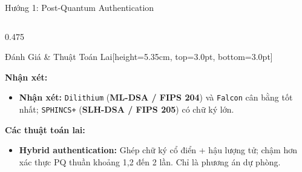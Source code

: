 \documentclass[aspectratio=169, 10pt]{beamer}
\begin{document}
\begin{frame}{Hướng 1: Post-Quantum Authentication}
\begin{columns}[T]
		\begin{column}{0.475\textwidth}
			\begin{accentcard}[uetgreen]{Đánh Giá \& Thuật Toán Lai}[height=5.35cm, top=3.0pt, bottom=3.0pt]
				\begin{uetcard}[colback=uetaccentbg, height=2.45cm, top=2.0pt, bottom=2.0pt]
					\raggedright\fontsize{5.8pt}{7.2pt}\selectfont
					\textbf{\color{uetblue}Nhận xét:}\par\vspace{2pt}
					\setlength{\leftmargini}{9pt}
					\begin{itemize}\setlength{\itemsep}{2.0pt}\setlength{\topsep}{0pt}\fontsize{5.7pt}{7.0pt}\selectfont
						\item \textbf{Nhận xét:} \texttt{Dilithium} (\textbf{ML-DSA / FIPS 204}) và \texttt{Falcon} cân bằng tốt nhất; \texttt{SPHINCS+} (\textbf{SLH-DSA / FIPS 205}) có chữ ký lớn.
					\end{itemize}
				\end{uetcard}\par\nointerlineskip\vspace{0.10cm}\noindent
				\begin{uetcard}[colback=uetgreenbg, height=2.35cm, top=2.0pt, bottom=2.0pt]
					\raggedright\fontsize{5.8pt}{7.2pt}\selectfont
					\textbf{\color{uetdarkgreen}Các thuật toán lai:}\par\vspace{2pt}
					\setlength{\leftmargini}{9pt}
					\begin{itemize}\setlength{\itemsep}{2.0pt}\setlength{\topsep}{0pt}\fontsize{5.7pt}{7.0pt}\selectfont
						\item \textbf{Hybrid authentication:} Ghép chữ ký cổ điển + hậu lượng tử; chậm hơn xác thực PQ thuần khoảng 1,2 đến 2 lần. Chỉ là phương án dự phòng.
					\end{itemize}
				\end{uetcard}
			\end{accentcard}
		\end{column}
	\end{columns}
\end{frame}
\end{document}

